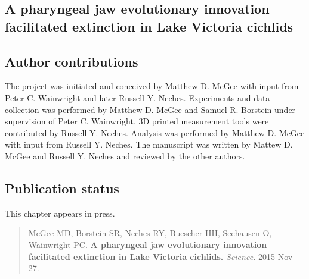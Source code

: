 \begin{refsection}

\chapter{A pharyngeal jaw evolutionary innovation facilitated extinction in Lake Victoria cichlids}


\section{Author contributions}

The project was initiated and conceived by Matthew D. McGee with input
from Peter C. Wainwright and later Russell Y. Neches. Experiments and
data collection was performed by Matthew D. McGee and Samuel R.
Borstein under supervision of Peter C. Wainwright. 3D printed
measurement tools were contributed by Russell Y. Neches. Analysis was
performed by Matthew D. McGee with input from Russell Y. Neches. The
manuscript was written by Mattew D. McGee and Russell Y. Neches and
reviewed by the other authors. 

\section{Publication status}

This chapter appears in press.

\begin{quote}
McGee MD, Borstein SR, Neches RY, Buescher HH, Seehausen O, Wainwright
PC. {\bf A pharyngeal jaw evolutionary innovation facilitated extinction in Lake Victoria cichlids.} {\em Science.} 2015 Nov 27.
\end{quote}





\printbibliography[heading=subbibliography]

\end{refsection}
